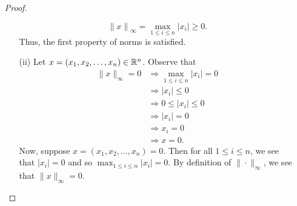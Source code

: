 \documentclass{article}
\begin{document}
\begin{enumerate}
\begin{proof}
\begin{enumerate}
               \[  {\|x\|}_{\infty } = \max_{1 \leq i \leq n} | {x}_{i} | \geq 0. \]
               Thus, the first property of norms is satisfied.
           \item[(ii)] Let \( x = ({x}_{1}, {x}_{2}, \dots, {x}_{n}) \in \mathbb{R}^{n} \). Observe that     
               \begin{align*}
                   \|x\|_{\infty } = 0 &\Longrightarrow \max_{1 \leq i \leq n} | {x}_{i} |  = 0    \\ 
                                       &\Longrightarrow | {x}_{i} | \leq 0 \tag{\( \forall 1 \leq i \leq n \)} \\
                                       &\Longrightarrow 0 \leq | {x}_{i} | \leq 0 \tag{\( \forall 1 \leq i \leq n \)} \\
                                       &\Longrightarrow | {x}_{i} |  = 0 \tag{\( \forall 1 \leq i \leq n \)} \\
                                       &\Longrightarrow {x}_{i} =  0 \tag{\( \forall 1 \leq i \leq n  \)} \\
                                       &\Longrightarrow x = 0.
               \end{align*}
               Now, suppose \( x = ({x}_{1}, {x}_{2}, \dots, {x}_{n}) = 0 \). Then for all \( 1 \leq i \leq n  \), we see that \( | {x}_{i} | = 0  \) and so \( \max_{1 \leq i \leq n } | {x}_{i} | = 0   \). By definition of \( \|\cdot\|_{\infty } \), we see that \( \|x\|_{\infty } = 0 \).


\end{enumerate}
\end{proof}
\end{enumerate}
\end{document}
